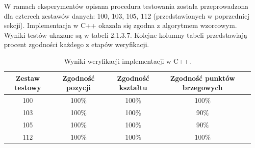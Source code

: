 W ramach eksperymentów opisana procedura testowania została przeprowadzona dla czterech zestawów danych: 100, 103, 105, 112 (przedstawionych w poprzedniej sekcji). Implementacja w C++ okazała się zgodna z algorytmem wzorcowym. Wyniki testów ukazane są w tabeli 2.1.3.7. Kolejne kolumny tabeli przedstawiają procent zgodności każdego z etapów weryfikacji.
\begin{table}[H]
	\centering
	\caption{Wyniki weryfikacji implementacji w C++.}
	\label{tab:ST_weryfikacja}
	\begin{tabular}{|c|c|c|c|c|}
	\hline
	Zestaw testowy & Zgodność pozycji & Zgodność kształtu & Zgodność punktów brzegowych \\ \hline
	100 & 100\% & 100\% & 100\%	\\ \hline
	103 & 100\% & 100\% & 90\%	\\ \hline
	105 & 100\% & 100\% & 90\%	\\ \hline
	112 & 100\% & 100\% & 100\%	\\ \hline
	\end{tabular}
\end{table}